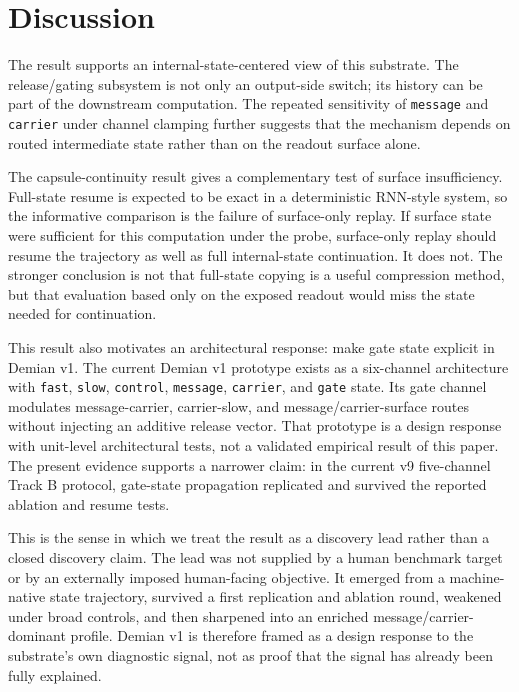 \documentclass[11pt]{article}
\begin{document}
\section{Discussion}

The result supports an internal-state-centered view of this substrate. The
release/gating subsystem is not only an output-side switch; its history can be
part of the downstream computation. The repeated sensitivity of
\texttt{message} and \texttt{carrier} under channel clamping further suggests
that the mechanism depends on routed intermediate state rather than on the
readout surface alone.

The capsule-continuity result gives a complementary test of surface
insufficiency. Full-state resume is expected to be exact in a deterministic
RNN-style system, so the informative comparison is the failure of surface-only
replay. If surface state were sufficient for this computation under the probe,
surface-only replay should resume the trajectory as well as full internal-state
continuation. It does not. The stronger conclusion is not that full-state
copying is a useful compression method, but that evaluation based only on the
exposed readout would miss the state needed for continuation.

This result also motivates an architectural response: make gate state explicit
in Demian v1. The current Demian v1 prototype exists as a six-channel
architecture with \texttt{fast}, \texttt{slow}, \texttt{control},
\texttt{message}, \texttt{carrier}, and \texttt{gate} state. Its gate channel
modulates message-carrier, carrier-slow, and message/carrier-surface routes
without injecting an additive release vector. That prototype is a design
response with unit-level architectural tests, not a validated empirical result
of this paper. The present evidence supports a narrower claim: in the current
v9 five-channel Track B protocol, gate-state propagation replicated and
survived the reported ablation and resume tests.

This is the sense in which we treat the result as a discovery lead rather than
a closed discovery claim. The lead was not supplied by a human benchmark target
or by an externally imposed human-facing objective. It emerged from a
machine-native state trajectory, survived a first replication and ablation
round, weakened under broad controls, and then sharpened into an enriched
message/carrier-dominant profile. Demian v1 is therefore framed as a
design response to the substrate's own diagnostic signal, not as proof that the
signal has already been fully explained.
\end{document}
